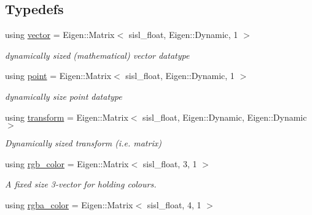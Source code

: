 \subsection*{Typedefs}
\begin{DoxyCompactItemize}
\item 
\mbox{\label{namespacesisl_a2069bd5374a9be042ff3ce3306d41e1a}} 
using \hyperlink{namespacesisl_a2069bd5374a9be042ff3ce3306d41e1a}{vector} = Eigen\+::\+Matrix$<$ sisl\+\_\+float, Eigen\+::\+Dynamic, 1 $>$
\begin{DoxyCompactList}\small\item\em dynamically sized (mathematical) vector datatype \end{DoxyCompactList}\item 
\mbox{\label{namespacesisl_afaf80b1234035c1dbd3d570c96c6a63a}} 
using \hyperlink{namespacesisl_afaf80b1234035c1dbd3d570c96c6a63a}{point} = Eigen\+::\+Matrix$<$ sisl\+\_\+float, Eigen\+::\+Dynamic, 1 $>$
\begin{DoxyCompactList}\small\item\em dynamically size point datatype \end{DoxyCompactList}\item 
\mbox{\label{namespacesisl_a2ef12d285ca3e626c05abbdec1f8a679}} 
using \hyperlink{namespacesisl_a2ef12d285ca3e626c05abbdec1f8a679}{transform} = Eigen\+::\+Matrix$<$ sisl\+\_\+float, Eigen\+::\+Dynamic, Eigen\+::\+Dynamic $>$
\begin{DoxyCompactList}\small\item\em Dynamically sized transform (i.\+e. matrix) \end{DoxyCompactList}\item 
\mbox{\label{namespacesisl_aa043f4ef2b36e60d18bb37009e3aeed2}} 
using \hyperlink{namespacesisl_aa043f4ef2b36e60d18bb37009e3aeed2}{rgb\+\_\+color} = Eigen\+::\+Matrix$<$ sisl\+\_\+float, 3, 1 $>$
\begin{DoxyCompactList}\small\item\em A fixed size 3-\/vector for holding colours. \end{DoxyCompactList}\item 
\mbox{\label{namespacesisl_acbd6b969b6b4f5c56b84502d3f561636}} 
using \hyperlink{namespacesisl_acbd6b969b6b4f5c56b84502d3f561636}{rgba\+\_\+color} = Eigen\+::\+Matrix$<$ sisl\+\_\+float, 4, 1 $>$

\end{DoxyCompactItemize}
